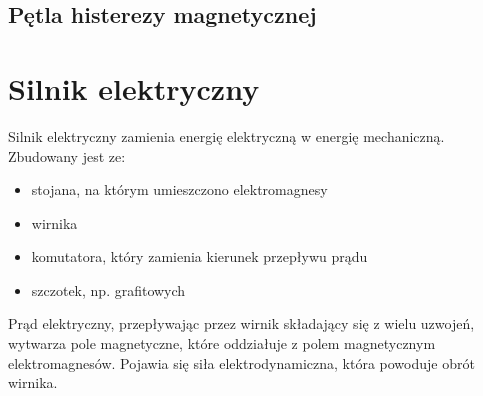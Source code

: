 \subsection{Pętla histerezy magnetycznej}

\section{Silnik elektryczny}
Silnik elektryczny zamienia energię elektryczną w energię mechaniczną. Zbudowany jest ze:
\begin{itemize}
  \item stojana, na którym umieszczono elektromagnesy
  \item wirnika
  \item komutatora, który zamienia kierunek przepływu prądu
  \item szczotek, np. grafitowych
\end{itemize}

Prąd elektryczny, przepływając przez wirnik składający się z wielu uzwojeń, wytwarza pole
magnetyczne, które oddziałuje z polem magnetycznym elektromagnesów. Pojawia się siła
elektrodynamiczna, która powoduje obrót wirnika.

